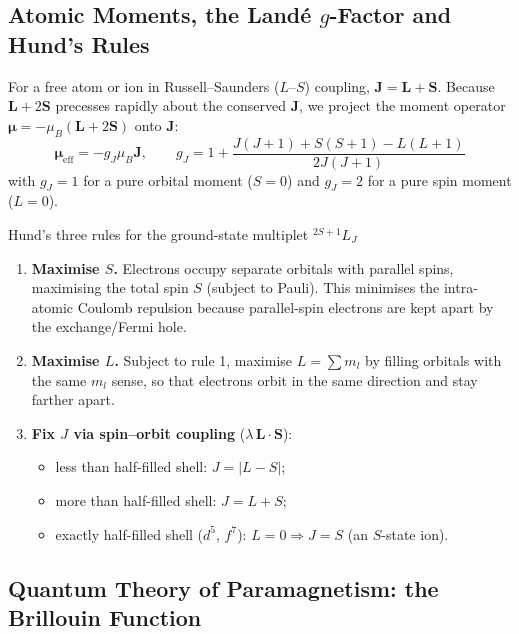 \documentclass[11pt,a4paper]{article}
\newcommand{\vb}[1]{\mathbf{#1}}
\begin{document}
\subsection{Atomic Moments, the Land\'e \texorpdfstring{$g$}{g}-Factor and Hund's Rules}

For a free atom or ion in Russell--Saunders ($L$--$S$) coupling, $\vb{J} = \vb{L}+\vb{S}$. Because $\vb{L}+2\vb{S}$ precesses rapidly about the conserved $\vb{J}$, we project the moment operator $\boldsymbol{\mu} = -\mu_B(\vb{L}+2\vb{S})$ onto $\vb{J}$:
\begin{equation}
    \boldsymbol{\mu}_{\mathrm{eff}} = -g_J\mu_B\vb{J},
    \qquad
    g_J = 1 + \frac{J(J+1)+S(S+1)-L(L+1)}{2J(J+1)}
    \label{eq:lande}
\end{equation}
with $g_J = 1$ for a pure orbital moment ($S=0$) and $g_J = 2$ for a pure spin moment ($L=0$).

\begin{keyeqbox}{Hund's three rules for the ground-state multiplet ${}^{2S+1}L_J$}
\begin{enumerate}[leftmargin=1.4cm, itemsep=1pt]
    \item \textbf{Maximise $S$.} Electrons occupy separate orbitals with parallel spins, maximising the total spin $S$ (subject to Pauli). This minimises the intra-atomic Coulomb repulsion because parallel-spin electrons are kept apart by the exchange/Fermi hole.
    \item \textbf{Maximise $L$.} Subject to rule 1, maximise $L = \sum m_l$ by filling orbitals with the same $m_l$ sense, so that electrons orbit in the same direction and stay farther apart.
    \item \textbf{Fix $J$ via spin--orbit coupling} ($\lambda\,\vb{L}\cdot\vb{S}$):
    \begin{itemize}[leftmargin=1.2cm, itemsep=0pt]
        \item less than half-filled shell: $J = |L-S|$;
        \item more than half-filled shell: $J = L+S$;
        \item exactly half-filled shell ($d^5$, $f^7$): $L = 0 \Rightarrow J = S$ (an $S$-state ion).
    \end{itemize}
\end{enumerate}
\end{keyeqbox}

\subsection{Quantum Theory of Paramagnetism: the Brillouin Function}
\end{document}
